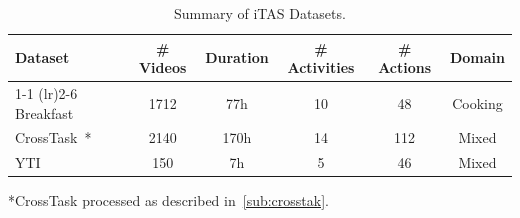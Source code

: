 \begin{table}[!h]
\begin{tabular}{lccccc}
\toprule
Dataset    & \# Videos & Duration & \# Activities & \# Actions & Domain \\ \cmidrule(lr){1-1} \cmidrule(lr){2-6}
Breakfast~\cite{kuehne2014language}  & 1712     & 77h      &  10          &  48       & Cooking \\ 
CrossTask~\cite{zhukov2019crosstask}* & 2140     & 170h     &  14          &  112      & Mixed \\ 
YTI~\cite{alayrac2016unsupervised}       & 150      & 7h       &  5           &  46       & Mixed \\ \bottomrule
\end{tabular}
\footnotesize{*CrossTask processed as described in~\cref{sub:crosstak}.}
\caption{
    Summary of iTAS Datasets. 
}
\label{tab:dataset_stats}
\end{table}